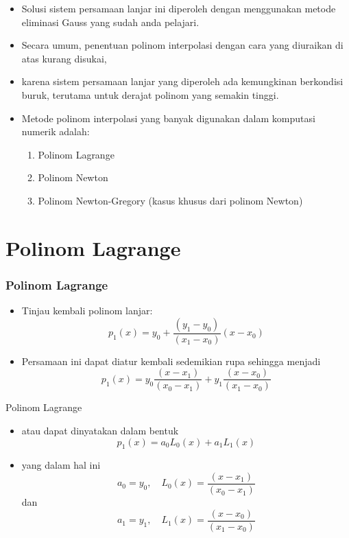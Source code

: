 \documentclass[pdflatex,compress,mathserif]{beamer}
\begin{document}
\begin{frame}
	\begin{itemize}
		\item Solusi sistem persamaan lanjar ini diperoleh dengan menggunakan metode eliminasi Gauss yang sudah anda pelajari.
		\item Secara umum, penentuan polinom interpolasi dengan cara yang diuraikan di atas kurang disukai,
		\item karena sistem persamaan lanjar yang diperoleh ada kemungkinan berkondisi buruk, terutama untuk derajat polinom yang semakin tinggi.
		\item Metode polinom interpolasi yang banyak digunakan dalam komputasi numerik adalah:
		\begin{enumerate}
			\item Polinom Lagrange
			\item Polinom Newton
			\item Polinom Newton-Gregory (kasus khusus dari polinom Newton)
		\end{enumerate}
	\end{itemize}
\end{frame}

\section{Polinom Lagrange}

\begin{frame}
	\frametitle{Polinom Lagrange}
	\begin{itemize}
		\item Tinjau kembali polinom lanjar:
		\[ p_1(x) = y_0 + \frac{(y_1 - y_0)}{(x_1 - x_0)}(x-x_0) \]
		\item Persamaan ini dapat diatur kembali sedemikian rupa sehingga menjadi
		\[ p_1(x) = y_0\frac{(x - x_1)}{(x_0 - x_1)} + y_1\frac{(x-x_0)}{(x_1-x_0)} \]
	\end{itemize}
\end{frame}

\begin{frame}{Polinom Lagrange}
	\begin{itemize}
		\item atau dapat dinyatakan dalam bentuk
		\[ p_1(x) = a_0 L_0 (x) + a_1 L_1 (x) \]
		\item yang dalam hal ini
		\[ a_0 = y_0,\quad L_0(x) = \frac{(x-x_1)}{(x_0-x_1)} \]
		dan
		\[ a_1 = y_1,\quad L_1(x) = \frac{(x-x_0)}{(x_1-x_0)} \]
	\end{itemize}
\end{frame}
\end{document}
